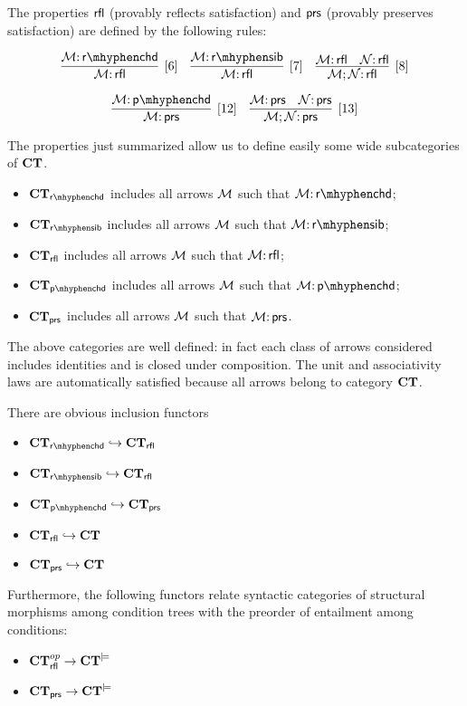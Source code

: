 \begin{definition}
    \label{def:prop-rfl-prs}
    The properties ${\mathsf{rfl}}$ (provably reflects satisfaction) and ${\mathsf{prs}}$ (provably preserves satisfaction) are defined by the following rules:

$$\infer[{[6]}]{\cM\of \rfl}{\cM\of \rchd} \quad \infer[{[7]}]{\cM\of \rfl}{\cM\of \rsib} \quad \infer[{[8]}]{\cM;\cN\of \rfl}{\cM\of \rfl & \cN \of \rfl} $$ 

$$\infer[{[12]}]{\cM\of \prs}{\cM\of \pchd} \quad
\infer[{[13]}]{\cM;\cN\of \prs}{\cM\of \prs & \cN \of \prs} $$ 
\end{definition}


The properties just summarized allow us to define easily some wide subcategories of $\CT$.

\begin{definition}[subcategories of $\CT$]
    \begin{itemize}
    \item $\CT_\rchd$ includes all arrows ${\mathcal{M}}$ such that $\cM\of \rchd$; 
    \item $\CT_\rsib$ includes all arrows ${\mathcal{M}}$ such that $\cM\of \rsib$;
    \item $\mathbf{CT}_{\mathsf{rfl}}$ includes all arrows ${\mathcal{M}}$ such that ${\mathcal{M}}{:}\, {\mathsf{rfl}}$;
    \item  $\CT_\pchd$ includes all arrows ${\mathcal{M}}$ such that $\cM\of \pchd$;
    \item $\mathbf{CT}_{\mathsf{prs}}$ includes all arrows ${\mathcal{M}}$ such that ${\mathcal{M}}{:}\, {\mathsf{prs}}$.
    \end{itemize}
    
    The above categories are well defined: in fact each class of arrows considered includes identities and is closed under composition. The unit and associativity laws are automatically satisfied because all arrows belong to category $\CT$.     
\end{definition}

\begin{proposition}
    There are obvious inclusion functors 
    \begin{itemize}
    \item $\CT_\rchd \hookrightarrow \CT_\rfl$
    \item $\CT_\rsib \hookrightarrow \CT_\rfl$
    \item $\CT_\pchd \hookrightarrow \CT_\prs$
    \item $\mathbf{CT}_{\mathsf{rfl}} \hookrightarrow \mathbf{CT}$
    \item $\mathbf{CT}_{\mathsf{prs}} \hookrightarrow \mathbf{CT}$
    \end{itemize}
    Furthermore, the following functors relate syntactic categories of structural morphisms among condition trees with the preorder of entailment among conditions:
    \begin{itemize}
    \item $\mathbf{CT}_{\mathsf{rfl}}^{op} \rightarrow \mathbf{CT}^{\models}$
    \item $\mathbf{CT}_{\mathsf{prs}} \rightarrow \mathbf{CT}^{\models}$
    \end{itemize} 
\end{proposition}

